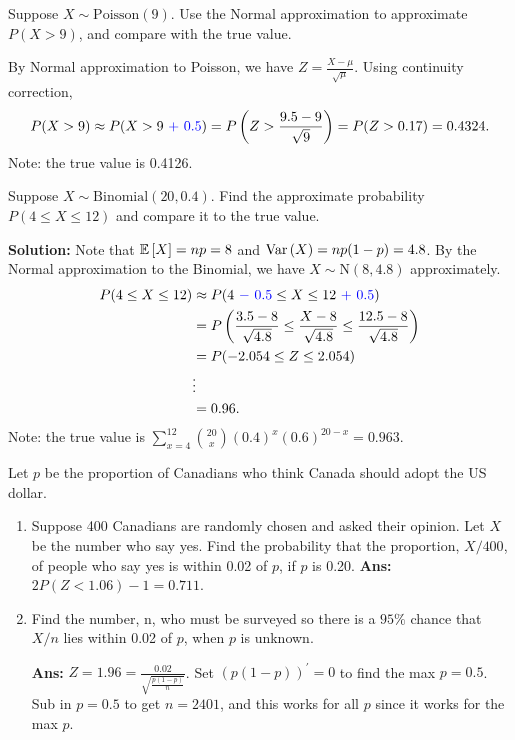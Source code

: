 \begin{example}
    Suppose $X \sim \text{Poisson}(9)$. Use the Normal approximation to approximate $P(X > 9)$, and compare with the true value.

    By Normal approximation to Poisson, we have $Z = \frac{X-\mu}{\sqrt{\mu}}$. Using continuity correction, \vspace{-3mm}
    \[
        P(X > 9) \approx P(X > 9 \text{ } {\color{blue} + \text{ } 0.5}) = P \left( Z > \frac{9.5 - 9}{\sqrt{9}} \right) = P(Z > 0.17) = 0.4324.
    \]
    Note: the true value is 0.4126.
\end{example}

\begin{example}
    Suppose $X \sim \text{Binomial}(20,0.4)$. Find the approximate probability $P(4 \leq X \leq 12)$ and compare it to the true value.

    \textbf{Solution:} Note that $\mathbb{E}\left[{X}\right] = np = 8$ and $\operatorname{Var}\left({X}\right) = np(1-p) = 4.8$. By the Normal approximation to the Binomial, we have $X \sim \text{N}(8,4.8)$ approximately.
    \begin{align*}
        P(4 \leq X \leq 12) &\approx P(4 \text{ } {\color{blue} - \text{ } 0.5} \leq X \leq 12 \text{ } {\color{blue} + \text{ } 0.5}) \\
        &= P \left( \frac{3.5 - 8}{\sqrt{4.8}} \leq \frac{X - 8}{\sqrt{4.8}} \leq \frac{12.5 - 8}{\sqrt{4.8}} \right) \\
        &= P(-2.054 \leq Z \leq 2.054) \\
        &\vdots \\
        &= 0.96.
    \end{align*}
    Note: the true value is $\displaystyle \sum_{x=4}^{12} \binom{20}{x} (0.4)^x (0.6)^{20-x} = 0.963$. \\
\end{example}

\begin{example}
    Let $p$ be the proportion of Canadians who think Canada should adopt the US dollar.
    \begin{enumerate}[label=(\alph*)]
        \item Suppose 400 Canadians are randomly chosen and asked their opinion. Let $X$ be the number who say yes. Find the probability that the proportion, $X/400$, of people who say yes is within 0.02 of $p$, if $p$ is 0.20.
        \quad \textbf{Ans:} $2P(Z < 1.06) - 1 = 0.711$.
        \item Find the number, n, who must be surveyed so there is a $95\%$ chance that $X/n$ lies within 0.02 of $p$, when $p$ is unknown.
        
        \textbf{Ans:} $Z = 1.96 = \frac{0.02}{\sqrt{\frac{p(1-p)}{n}}}$. Set $(p(1-p))^\prime = 0$ to find the max $p = 0.5$. Sub in $p = 0.5$ to get $n = 2401$, and this works for all $p$ since it works for the max $p$.
    \end{enumerate}
\end{example}


